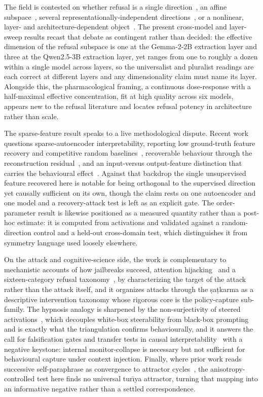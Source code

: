 The field is contested on whether refusal is a single
direction~\cite{arditi2024refusal}, an affine subspace~\cite{marshall2024refusal},
several representationally-independent directions~\cite{wollschlager2025geometry,piras2025som},
or a nonlinear, layer- and architecture-dependent
object~\cite{hildebrandt2025refusal}. The present cross-model and layer-sweep results
recast that debate as contingent rather than decided: the effective dimension of the
refusal subspace is one at the Gemma-2-2B extraction layer and three at the
Qwen2.5-3B extraction layer, yet ranges from one to roughly a dozen within a single
model across layers, so the universalist and pluralist readings are each correct at
different layers and any dimensionality claim must name its layer. Alongside this, the
pharmacological framing, a continuous dose-response with a half-maximal effective
concentration, fit at high quality across six models, appears new to the refusal
literature and locates refusal potency in architecture rather than scale.

The sparse-feature result speaks to a live methodological dispute. Recent work
questions sparse-autoencoder interpretability, reporting low ground-truth feature
recovery and competitive random baselines~\cite{korznikov2026sanity}, recoverable
behaviour through the reconstruction residual~\cite{cui2026sae}, and an input-versus
output-feature distinction that carries the behavioural effect~\cite{arad2025good}.
Against that backdrop the single unsupervised feature recovered here is notable for
being orthogonal to the supervised direction yet causally sufficient on its own,
though the claim rests on one autoencoder and one model and a recovery-attack test is
left as an explicit gate. The order-parameter result is likewise positioned as a
measured quantity rather than a post-hoc estimate: it is computed from activations and
validated against a random-direction control and a held-out cross-domain test, which
distinguishes it from symmetry language used loosely elsewhere.

On the attack and cognitive-science side, the work is complementary to mechanistic
accounts of how jailbreaks succeed, attention hijacking~\cite{ben_tov2025universal}
and a sixteen-category refusal taxonomy~\cite{von_recum2024cannot}, by characterizing
the target of the attack rather than the attack itself, and it organizes attacks
through the \d{s}a\d{t}karma as a descriptive intervention taxonomy whose rigorous core
is the policy-capture sub-family. The hypnosis analogy is sharpened by the
non-surjectivity of steered activations~\cite{mishra2026steered}, which decouples
white-box steerability from black-box prompting and is exactly what the triangulation
confirms behaviourally, and it answers the call for falsification gates and transfer
tests in causal interpretability~\cite{joshi2026causality} with a negative keystone:
internal monitor-collapse is necessary but not sufficient for behavioural capture under
context injection. Finally, where prior work reads successive self-paraphrase as
convergence to attractor cycles~\cite{wang2025paraphrase}, the anisotropy-controlled
test here finds no universal tur\=\i ya attractor, turning that mapping into an
informative negative rather than a settled correspondence.
